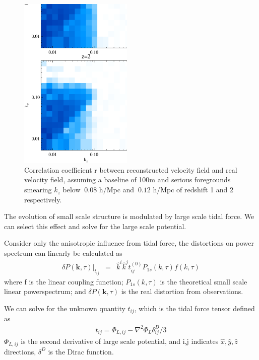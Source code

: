 \begin{figure}[tbp]
\begin{center}
\includegraphics[width=0.48\textwidth]{figure/powv2d_z1z2_r15r10.eps}
\end{center}
\vspace{-0.7cm}
    \caption{Correlation coefficient r between reconstructed velocity field and real velocity field, 
    assuming a baseline of 100m and serious foregrounds 
    smearing $k_z$ below $~0.08$ h/Mpc and $~0.12$ h/Mpc of redshift 1 and 2 respectively. 
}
\label{fig:v}
\end{figure}

The evolution of small scale structure is modulated by large scale 
tidal force. We can select this effect and solve for the large scale potential. 

Consider only the anisotropic influence from tidal force, 
the distortions on power spectrum can linearly be calculated as  
\begin{eqnarray}
\label{eq:powerdistort}
\delta P(\bm{k},\tau)|_{t_{ij}}&=&
\hat{k}^i\hat{k}^jt_{ij}^{(0)}P_{1s}(k,\tau)f(k,\tau)
\end{eqnarray}
where f is the linear coupling function;
$P_{1s}(k,\tau)$ is the theoretical small scale linear powerspectrum; 
and $\delta P(\bm{k},\tau)$ is the real distortion from observations. 

We can solve for the unknown quantity $t_{ij}$, 
which is the tidal force tensor defined as 
\begin{eqnarray}
\label{eq:tij}
t_{ij}=\Phi_{L,ij}-\nabla^2\Phi_L\delta^D_{ij}/3
\end{eqnarray}
$\Phi_{L,ij}$ is the second derivative of large scale potential, 
and i,j indicates $\hat x,\hat y,\hat z$ directions, 
$\delta^D$ is the Dirac function.

